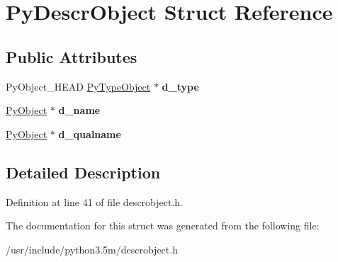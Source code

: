 \hypertarget{structPyDescrObject}{}\section{Py\+Descr\+Object Struct Reference}
\label{structPyDescrObject}
\subsection*{Public Attributes}
\begin{DoxyCompactItemize}
\item 
Py\+Object\+\_\+\+H\+E\+AD \hyperlink{struct__typeobject}{Py\+Type\+Object} $\ast$ {\bfseries d\+\_\+type}\hypertarget{structPyDescrObject_a983cb601fb2785b64f82a260516e42de}{}\label{structPyDescrObject_a983cb601fb2785b64f82a260516e42de}

\item 
\hyperlink{struct__object}{Py\+Object} $\ast$ {\bfseries d\+\_\+name}\hypertarget{structPyDescrObject_a1f334bf996612d1c5b544cbdcb838622}{}\label{structPyDescrObject_a1f334bf996612d1c5b544cbdcb838622}

\item 
\hyperlink{struct__object}{Py\+Object} $\ast$ {\bfseries d\+\_\+qualname}\hypertarget{structPyDescrObject_af15e52ef3141d327ce06f4accda3b659}{}\label{structPyDescrObject_af15e52ef3141d327ce06f4accda3b659}

\end{DoxyCompactItemize}


\subsection{Detailed Description}


Definition at line 41 of file descrobject.\+h.



The documentation for this struct was generated from the following file\+:\begin{DoxyCompactItemize}
\item 
/usr/include/python3.\+5m/descrobject.\+h\end{DoxyCompactItemize}
